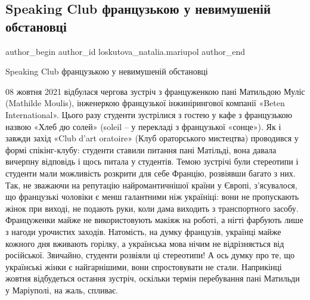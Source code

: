  
 
 
 
 

\subsection{Speaking Club французькою у невимушеній обстановці}
\label{sec:10_10_2021.fb.loskutova_natalia.mariupol.1.speaking_club_frants}

\ifcmt
 author_begin
   author_id loskutova_natalia.mariupol
 author_end
\fi

Speaking Club французькою у невимушеній обстановці 

08 жовтня 2021 відбулася чергова зустріч з француженкою пані Матильдою Муліс
(Mathilde Moulis), інженеркою французької інжинірингової компанії «Beten
International». Цього разу студенти зустрілися з гостею у кафе з французькою
назвою «Хлеб дю солей» (soleil – у перекладі з французької «сонце»). Як і
завжди захід «Club d'art oratoire» (Клуб ораторського мистецтва) проводився у
формі спікінг-клубу: студенти ставили питання пані Матільді, вона давала
вичерпну відповідь і щось питала у студентів. Темою зустрічі були стереотипи і
студенти мали можливість розкрити для себе Францію, розвіявши багато з них.
Так, не зважаючи на репутацію найромантичнішої країни у Європі, з'ясувалося, що
французькі чоловіки є менш галантними ніж україніці: вони не пропускають жінок
при виході, не подають руки, коли дама виходить з транспортного засобу.
Француженки майже не використовують макіяж на роботі, а нігті фарбують лише з
нагоди урочистих заходів. Натомість, на думку французів, українці майже кожного
дня вживають горілку, а українська мова нічим не відрізняється від російської.
Звичайно, студенти розвіяли ці стереотипи! А ось думку про те, що українські
жінки є найгарнішими, вони спростовувати не стали. Наприкінці жовтня
відбудеться остання зустріч, оскільки термін перебування пані Матильди у
Маріуполі, на жаль, спливає.
